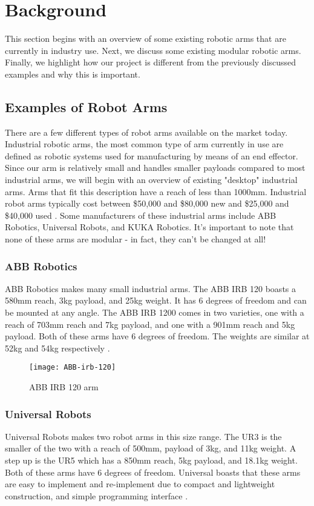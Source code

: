 \section{Background}
This section begins with an overview of some existing robotic arms that are currently in industry use. Next, we discuss some existing modular robotic arms. Finally, we highlight how our project is different from the previously discussed examples and why this is important.

\subsection{Examples of Robot Arms}
There are a few different types of robot arms available on the market today.  Industrial robotic arms, the most common type of arm currently in use are defined as robotic systems used for manufacturing by means of an end effector. Since our arm is relatively small and handles smaller payloads compared to most industrial arms, we will begin with an overview of existing "desktop" industrial arms. Arms that fit this description have a reach of less than 1000mm. Industrial robot arms typically cost between \$50,000 and \$80,000 new and \$25,000 and \$40,000 used \cite{RobotWorx}. Some manufacturers of these industrial arms include ABB Robotics, Universal Robots, and KUKA Robotics. It's important to note that none of these arms are modular - in fact, they can't be changed at all!

\subsubsection{ABB Robotics}
ABB Robotics makes many small industrial arms. The ABB IRB 120 boasts a 580mm reach, 3kg payload, and 25kg weight. It has 6 degrees of freedom and can be mounted at any angle. The ABB IRB 1200 comes in two varieties, one with a reach of 703mm reach and 7kg payload, and one with a 901mm reach and 5kg payload. Both of these arms have 6 degrees of freedom. The weights are similar at 52kg and 54kg respectively \cite{RobotWorx}.

\begin{figure}[H]
\centering
\texttt{[image: ABB-irb-120]}
\caption{ABB IRB 120 arm \cite{IRB_120}}
\label{fig:abb-irb-120}
\end{figure}

\subsubsection{Universal Robots}
Universal Robots makes two robot arms in this size range. The UR3 is the smaller of the two with a reach of 500mm, payload of 3kg, and 11kg weight. A step up is the UR5 which has a 850mm reach, 5kg payload, and 18.1kg weight. Both of these arms have 6 degrees of freedom. Universal boasts that these arms are easy to implement and re-implement due to compact and lightweight construction, and simple programming interface \cite{RobotWorx}.

